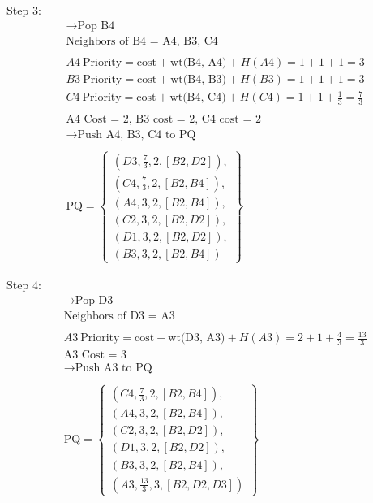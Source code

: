 \documentclass[a4paper]{article}
\begin{document}
\begin{sloppypar}
\begin{enumerate}[start=6,label=Q\arabic*,left=0pt]
    \par Step 3:
    \begin{align*}
        &\rightarrow \text{Pop B4} \\
        &\text{Neighbors of B4 = A4, B3, C4} \\\\
        &A4 \: \text{Priority} = \text{cost} + \text{wt(B4, A4)} + H(A4) = 1 + 1 + 1 = 3 \\
        &B3 \: \text{Priority} = \text{cost} + \text{wt(B4, B3)} + H(B3) = 1 + 1 + 1 = 3 \\
        &C4 \: \text{Priority} = \text{cost} + \text{wt(B4, C4)} + H(C4) = 1 + 1 + \frac{1}{3} = \frac{7}{3} \\\\
        &\text{A4 Cost = 2, B3 cost = 2, C4 cost = 2} \\
        &\rightarrow \text{Push A4, B3, C4 to PQ} \\\\
        &\text{PQ} = \left\{\begin{array}{l}
            (D3, \frac{7}{3}, 2, [B2, D2]), \\
            (C4, \frac{7}{3}, 2, [B2, B4]), \\
            (A4, 3, 2, [B2, B4]), \\
            (C2, 3, 2, [B2, D2]), \\
            (D1, 3, 2, [B2, D2]), \\
            (B3, 3, 2, [B2, B4])
        \end{array}\right\}
    \end{align*}

    \par Step 4:
    \begin{align*}
        &\rightarrow \text{Pop D3} \\
        &\text{Neighbors of D3 = A3} \\\\
        &A3 \: \text{Priority} = \text{cost} + \text{wt(D3, A3)} + H(A3) = 2 + 1 + \frac{4}{3} = \frac{13}{3} \\
        &\text{A3 Cost = 3} \\
        &\rightarrow \text{Push A3 to PQ} \\\\
        &\text{PQ} = \left\{\begin{array}{l}
            (C4, \frac{7}{3}, 2, [B2, B4]), \\
            (A4, 3, 2, [B2, B4]), \\
            (C2, 3, 2, [B2, D2]), \\
            (D1, 3, 2, [B2, D2]), \\
            (B3, 3, 2, [B2, B4]), \\
            (A3, \frac{13}{3}, 3, [B2, D2, D3])
        \end{array}\right\}
    \end{align*}


\end{enumerate}
\end{sloppypar}
\end{document}

